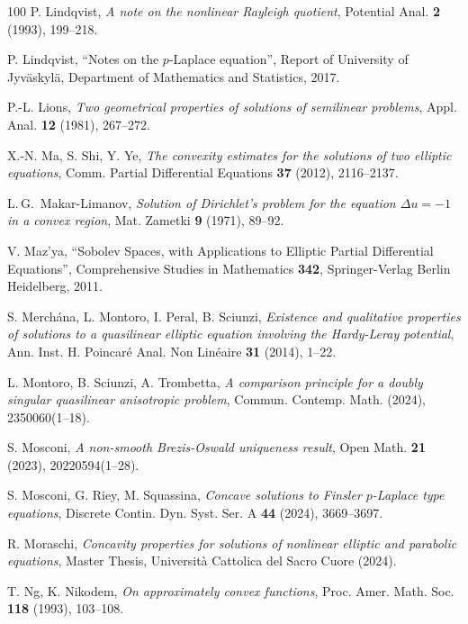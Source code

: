 \documentclass[11pt, reqno]{amsart}
\theoremstyle{definition}
\numberwithin{equation}{section}
\begin{document}
\begin{thebibliography}{100}
 P. Lindqvist,
\emph{A note on the nonlinear Rayleigh quotient},
Potential Anal. \textbf{2} (1993), %
199--218.

 P. Lindqvist,
``Notes on the $p$-Laplace equation'',
Report of University of Jyväskylä, Department of Mathematics and Statistics, 2017.

 P.-L. Lions, 
\emph{Two geometrical properties of solutions of semilinear problems},
Appl. Anal. \textbf{12} (1981), %
267--272.

 X.-N. Ma, S. Shi, Y. Ye,
\emph{The convexity estimates for the solutions of two elliptic equations},
Comm. Partial Differential Equations \textbf{37} (2012), %
2116--2137.

 L.$\,$G.\ Makar-Limanov,
\emph{Solution of Dirichlet’s problem for the equation $\Delta u = -1$ in a convex region},
Mat. Zametki \textbf{9} (1971), %
89--92.
 
 V. Maz’ya,
``Sobolev Spaces, with Applications to Elliptic Partial Differential Equations'',
Comprehensive Studies in Mathematics \textbf{342}, Springer-Verlag Berlin Heidelberg, 2011.

 S. Merchána, L. Montoro, I. Peral, B. Sciunzi, 
\emph{Existence and qualitative properties of solutions to a quasilinear elliptic equation involving the Hardy-Leray potential},
Ann. Inst. H. Poincaré Anal. Non Linéaire \textbf{31} (2014), %
1--22.

 L. Montoro, B. Sciunzi, A. Trombetta,
\emph{A comparison principle for a doubly singular quasilinear anisotropic problem},
Commun. Contemp. Math. %
(2024), %
2350060(1--18). 

 S. Mosconi,
\emph{A non-smooth Brezis-Oswald uniqueness result},
Open Math. \textbf{21} (2023), %
20220594(1--28).

 S. Mosconi, G. Riey, M. Squassina,
\emph{Concave solutions to Finsler $p$-Laplace type equations},
Discrete Contin. Dyn. Syst. Ser. A \textbf{44} (2024), %
3669--3697.

 R. Moraschi, 
\emph{Concavity properties for solutions of nonlinear elliptic and parabolic equations},
Master Thesis, Università Cattolica del Sacro Cuore (2024).

 T. Ng, K. Nikodem,
\emph{On approximately convex functions},
Proc. Amer. Math. Soc. \textbf{118} (1993), %
103--108.


\end{thebibliography}
\end{document}
